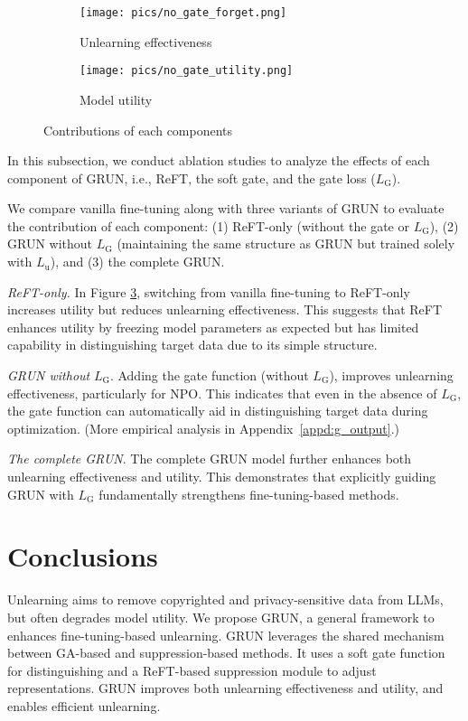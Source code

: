 \begin{figure}[t]
    \centering
    \begin{subfigure}[b]{0.499\linewidth}
        \centering
        \texttt{[image: pics/no\_gate\_forget.png]}
        \vspace{-0.35in}
        \caption{Unlearning effectiveness}
        \label{fig:llama_gd}
    \end{subfigure}\hfill
    \begin{subfigure}[b]{0.499\linewidth}
        \centering
        \texttt{[image: pics/no\_gate\_utility.png]}
        \vspace{-0.35in}
        \caption{Model utility}
        \label{fig:llama_npo}
    \end{subfigure}
    \caption{Contributions of each components}
    \vspace{-0.05in}
    \label{fig:abl_component}
\end{figure}

In this subsection, we conduct ablation studies to analyze the effects of each component of GRUN, i.e., ReFT, the soft gate, and the gate loss ($L_{\text{G}}$).

We compare vanilla fine-tuning along with three variants of GRUN to evaluate the contribution of each component: (1) ReFT-only (without the gate or $L_{\text{G}}$), (2) GRUN without $L_{\text{G}}$ (maintaining the same structure as GRUN but trained solely with $L_{\text{u}}$), and (3) the complete GRUN. 

\textit{ReFT-only.} In Figure \ref{fig:abl_component}, switching from vanilla fine-tuning to ReFT-only increases utility but reduces unlearning effectiveness. This suggests that ReFT enhances utility by freezing model parameters as expected but has limited capability in distinguishing target data due to its simple structure.

\textit{GRUN without} $L_{\text{G}}$. Adding the gate function (without $L_{\text{G}}$), improves unlearning effectiveness, particularly for NPO. This indicates that even in the absence of $L_{\text{G}}$, the gate function can automatically aid in distinguishing target data during optimization. (More empirical analysis in Appendix~\ref{appd:g_output}.)

\textit{The complete GRUN}. The complete GRUN model further enhances both unlearning effectiveness and utility. This demonstrates that explicitly guiding GRUN with $L_{\text{G}}$ fundamentally strengthens fine-tuning-based methods.


\section{Conclusions}

Unlearning aims to remove copyrighted and privacy-sensitive data from LLMs, but often degrades model utility. We propose GRUN, a general framework to enhances fine-tuning-based unlearning. GRUN leverages the shared mechanism between GA-based and suppression-based methods. It uses a soft gate function for distinguishing and a ReFT-based suppression module to adjust representations. GRUN improves both unlearning effectiveness and utility, and enables efficient unlearning.


